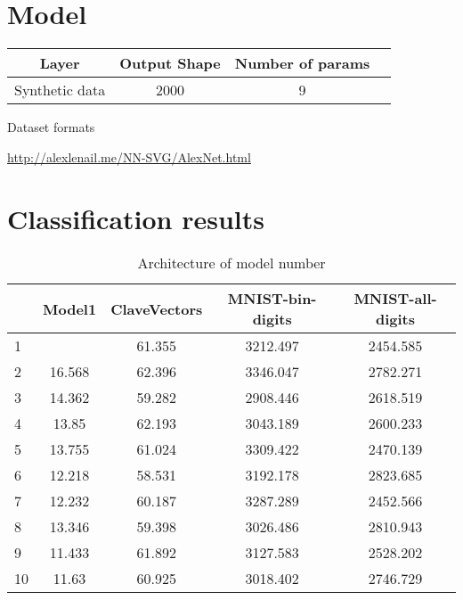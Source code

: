 \section{Model}
\begin{table}[H]
	\centering
	 \label{tab:title2} 
	\begin{tabular}{|c|c|c| c|} \hline
		\textbf{Layer} & \textbf{Output Shape } & \textbf{Number of params} \\ \hline \hline 
		Synthetic data & 2000 &  9  \\ \hline 

	\end{tabular}
	\par \bigskip Dataset formats
	\label{datasets}
\end{table}

\url{http://alexlenail.me/NN-SVG/AlexNet.html}

\section{Classification results}
\begin{table}[H]
	\centering
\begin{tabular}{|lcccc|}
	\hline
	\backslashbox{run \#}{Model}
&{Model1}&{ClaveVectors}&{MNIST-bin-digits}&{MNIST-all-digits} \\\hline\hline
	1 &  & 61.355 & 3212.497 & 2454.585 \\ \hline
	2 & 16.568 & 62.396 & 3346.047 & 2782.271 \\ \hline
	3 & 14.362 & 59.282 & 2908.446 & 2618.519 \\ \hline
	4 & 13.85 & 62.193 & 3043.189 &  2600.233 \\ \hline
	5 & 13.755 & 61.024 & 3309.422 & 2470.139 \\ \hline
	6 & 12.218 & 58.531 & 3192.178 & 2823.685 \\ \hline
	7 & 12.232 & 60.187 & 3287.289 & 2452.566 \\ \hline
	8 & 13.346 & 59.398 & 3026.486 & 2810.943 \\ \hline
	9 & 11.433 & 61.892 & 3127.583 & 2528.202 \\ \hline
	10 & 11.63 & 60.925 & 3018.402 & 2746.729 \\ \hline
\end{tabular}
	\caption{Architecture of model number}
\end{table}

